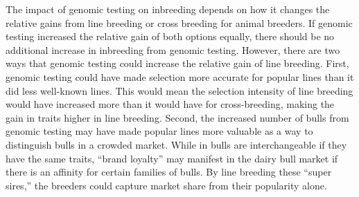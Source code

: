 \documentclass[12pt,letterpaper]{article}
\begin{document}
The impact of genomic testing on inbreeding depends on how it changes the relative gains from line breeding or cross breeding for animal breeders.
If genomic testing increased the relative gain of both options equally, there should be no additional increase in inbreeding from genomic testing.
However, there are two ways that genomic testing could increase the relative gain of line breeding.
First, genomic testing could have made selection more accurate for popular lines than it did less well-known lines.
This would mean the selection intensity of line breeding would have increased more than it would have for cross-breeding, making the gain in traits higher in line breeding.
Second, the increased number of bulls from genomic testing may have made popular lines more valuable as a way to distinguish bulls in a crowded market.
While in \citet{Melton1994} bulls are interchangeable if they have the same traits, ``brand loyalty'' may manifest in the dairy bull market if there is an affinity for certain families of bulls.
By line breeding these ``super sires,'' the breeders could capture market share from their popularity alone.





\end{document}
